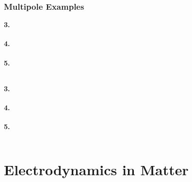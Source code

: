 \documentclass[12pt]{article}
\begin{document}
\subsubsection{Multipole Examples}
\hfill \break
\begin{minipage}[t]{0.48\textwidth}
	\textbf{3. \ \ \ }\\ \\
	
	\hfill \break
	\textbf{4. \ \ \ }\\ \\

	\hfill \break
	\textbf{5. \ \ \ }\\ \\

\end{minipage}
\hfill\vline\hfill
\begin{minipage}[t]{0.48\textwidth}
	\textbf{3. \ \ \ }\\ \\
	
	\hfill \break
	\textbf{4. \ \ \ }\\ \\

	\hfill \break
	\textbf{5. \ \ \ }\\ \\

\end{minipage}

\newpage
\section{Electrodynamics in Matter}
\end{document}
